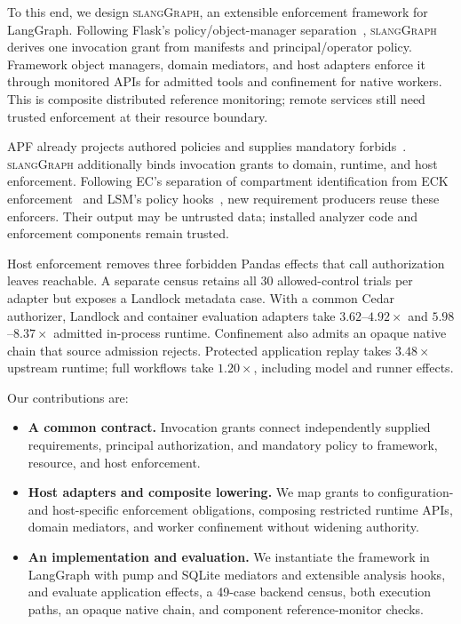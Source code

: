 \documentclass[letterpaper,twocolumn,10pt]{article}
\newcommand{\sys}{\textsc{slangGraph}\xspace}
\begin{document}
To this end, we design \sys, an extensible enforcement framework for LangGraph.
Following Flask's policy/object-manager separation~\cite{spencer1999flask},
\sys derives one invocation grant from manifests and principal/operator policy.
Framework object managers, domain mediators, and host adapters enforce it
through monitored APIs for admitted tools and confinement for native workers.
This is composite distributed reference monitoring; remote services still need
trusted enforcement at their resource boundary.

APF already projects authored policies and supplies mandatory forbids~\cite{apf,apfprojection}.
\sys additionally binds invocation grants to domain, runtime, and host enforcement.
Following EC's separation of compartment identification from ECK enforcement~\cite{khan2023ec}
and LSM's policy hooks~\cite{wright2002lsm}, new requirement producers reuse
these enforcers. Their output may be untrusted data; installed analyzer code
and enforcement components remain trusted.

Host enforcement removes three forbidden Pandas effects that call authorization
leaves reachable. A separate census retains all 30 allowed-control trials per
adapter but exposes a Landlock metadata case. With a common Cedar authorizer,
Landlock and container evaluation adapters take $3.62$--$4.92\times$ and
$5.98$--$8.37\times$ admitted in-process runtime. Confinement also admits an
opaque native chain that source admission rejects. Protected application replay
takes $3.48\times$ upstream runtime; full workflows take $1.20\times$, including
model and runner effects.

\begin{samepage}
Our contributions are:
\begin{itemize}
  \item \textbf{A common contract.} Invocation grants connect independently
  supplied requirements, principal authorization, and mandatory policy to
  framework, resource, and host enforcement.
  \item \textbf{Host adapters and composite lowering.} We map grants to
  configuration- and host-specific enforcement obligations, composing restricted
  runtime APIs, domain mediators, and worker confinement without widening
  authority.
  \item \textbf{An implementation and evaluation.} We instantiate the framework
  in LangGraph with pump and SQLite mediators and extensible analysis hooks,
  and evaluate application effects, a 49-case backend census, both execution
  paths, an opaque native chain, and component reference-monitor checks.
\end{itemize}
\end{samepage}
\end{document}
